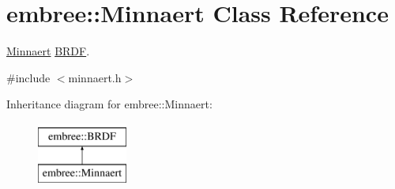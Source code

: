 \hypertarget{classembree_1_1_minnaert}{
\section{embree::Minnaert Class Reference}
\label{classembree_1_1_minnaert}
}


\hyperlink{classembree_1_1_minnaert}{Minnaert} \hyperlink{classembree_1_1_b_r_d_f}{BRDF}.  




{\ttfamily \#include $<$minnaert.h$>$}

Inheritance diagram for embree::Minnaert:\begin{figure}[H]
\begin{center}
\leavevmode
\includegraphics[height=2.000000cm]{classembree_1_1_minnaert}
\end{center}
\end{figure}
